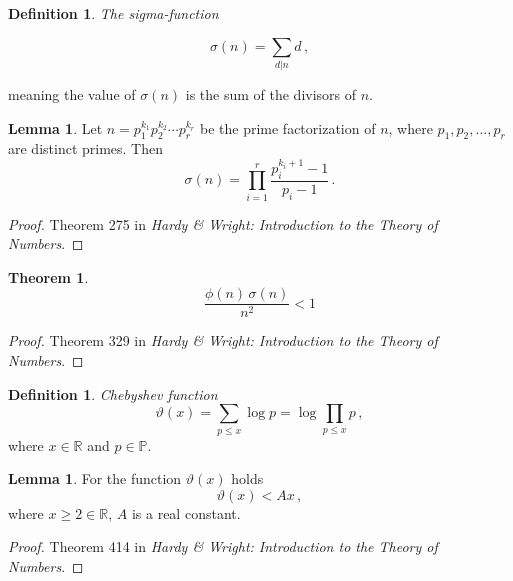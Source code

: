 \documentclass{article}
\theoremstyle{definition}
\newtheorem{definition}[subsubsection]{Definition}
\newtheorem{lemma}[subsubsection]{Lemma}
\newtheorem{theorem}[subsubsection]{Theorem}
\begin{document}
\begin{definition}{\emph{The sigma-function}}

\begin{equation*}
    \sigma(n)=\sum_{d\vert n} d\,,
\end{equation*}

meaning the value of $\sigma(n)$ is the sum of the divisors of $n$.
\end{definition}

\begin{lemma}
\label{lemma:sigma}
Let $n=p_1^{k_1}p_2^{k_2}\cdots p_r^{k_r}$ be the prime factorization of $n$, where $p_1,p_2,...,p_r$ are distinct primes. Then
\begin{equation*}
    \sigma(n)=\prod_{i=1}^r \frac{p_i^{k_i+1}-1}{p_i-1}\,.
\end{equation*}

\begin{proof}
Theorem 275 in \textit{Hardy \& Wright: Introduction to the Theory of Numbers}.
\end{proof}
\end{lemma}

\begin{theorem}
\label{thm:sigmafii}
\begin{equation*}
    \frac{\phi(n)\,\sigma(n)}{n^2}<1
\end{equation*}

\begin{proof}
Theorem 329 in \textit{Hardy \& Wright: Introduction to the Theory of Numbers}.
\end{proof}
\end{theorem}


\begin{definition}{\emph{Chebyshev function}}
\begin{equation*}
    \vartheta(x)=\sum_{p\leq x} \log p = \log \prod_{p\leq x} p\,,
\end{equation*}
where $x\in\mathbb{R}$ and $p\in\mathbb{P}$.

\end{definition}

\begin{lemma}
\label{lemma:vartheta}
For the function $\vartheta(x)$ holds
\begin{equation*}
    \vartheta(x) < Ax\,,
\end{equation*}
where $x\geq2\in\mathbb{R}$, $A$ is a real constant.

\begin{proof}
Theorem 414 in \textit{Hardy \& Wright: Introduction to the Theory of Numbers}.
\end{proof}
\end{lemma}
\end{document}
